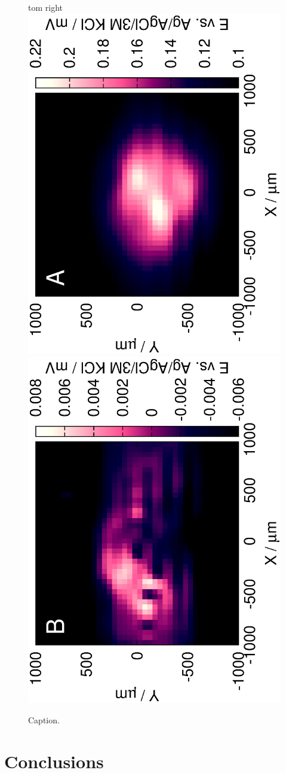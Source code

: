 \documentclass[3p]{elsarticle}
\begin{document}
\begin{figure}
tom right
\includegraphics[trim = 10mm 20mm 0mm 10mm, clip, width=\s\textwidth, angle=-90]{17012501.eps}\includegraphics[trim = 10mm 20mm 0mm 10mm, clip, width=\s\textwidth, angle=-90]{17012503_deconvoluted.eps}
\caption{Caption.}
\label{fig:label1}
\end{figure}





\section{Conclusions}
\sectio
\end{document}
